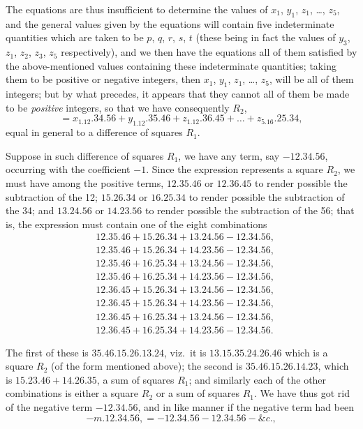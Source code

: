 \documentclass[11pt,a4paper,english]{article}
\theoremstyle{plain}
\begin{document}
The equations are thus insufficient to determine the values of $x_1$, $y_1$, $z_1$, \ldots, $z_5$, and the general values given by the equations will contain five indeterminate quantities which are taken to be $p$, $q$, $r$, $s$, $t$ (these being in fact the values of $y_3$, $z_1$, $z_2$, $z_3$, $z_5$ respectively), and we then have the equations all of them satisfied by the above-mentioned values containing these indeterminate quantities; taking them to be positive or negative integers, then $x_1$, $y_1$, $z_1$, \ldots, $z_5$, will be all of them integers; but by what precedes, it appears that they cannot all of them be made to be \textit{positive} integers, so that we have consequently $R_2$,
\[
= x_1.12.34.56 + y_1.12.35.46 + z_1.12.36.45 + \ldots + z_5.16.25.34,
\]
equal in general to a difference of squares $R_1$.

Suppose in such difference of squares $R_1$, we have any term, say $-12.34.56$, occurring with the coefficient $-1$. Since the expression represents a square $R_2$, we must have among the positive terms, $12.35.46$ or $12.36.45$ to render possible the subtraction of the 12; $15.26.34$ or $16.25.34$ to render possible the subtraction of the 34; and $13.24.56$ or $14.23.56$ to render possible the subtraction of the 56; that is, the expression must contain one of the eight combinations
\begin{align*}
&12.35.46 + 15.26.34 + 13.24.56 - 12.34.56,\\
&12.35.46 + 15.26.34 + 14.23.56 - 12.34.56,\\
&12.35.46 + 16.25.34 + 13.24.56 - 12.34.56,\\
&12.35.46 + 16.25.34 + 14.23.56 - 12.34.56,\\
&12.36.45 + 15.26.34 + 13.24.56 - 12.34.56,\\
&12.36.45 + 15.26.34 + 14.23.56 - 12.34.56,\\
&12.36.45 + 16.25.34 + 13.24.56 - 12.34.56,\\
&12.36.45 + 16.25.34 + 14.23.56 - 12.34.56.
\end{align*}

The first of these is $35.46.15.26.13.24$, viz.\ it is $13.15.35.24.26.46$ which is a square $R_2$ (of the form mentioned above); the second is $35.46.15.26.14.23$, which is $15.23.46 + 14.26.35$, a sum of squares $R_1$; and similarly each of the other combinations is either a square $R_2$ or a sum of squares $R_1$. We have thus got rid of the negative term $-12.34.56$, and in like manner if the negative term had been
\[
-m.12.34.56, = -12.34.56 - 12.34.56 - \&c.,
\]
\end{document}
